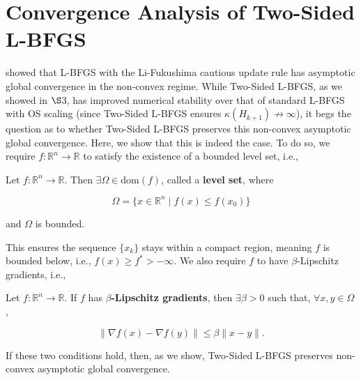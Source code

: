 \documentclass[twoside,11pt]{article}
\begin{document}
\section{Convergence Analysis of Two-Sided L-BFGS}

\cite{LF01-SIAM} showed that L-BFGS with the Li-Fukushima cautious update rule has asymptotic global convergence in the non-convex regime. While Two-Sided L-BFGS, as we showed in $\S$3, has improved numerical stability over that of standard L-BFGS with OS scaling (since Two-Sided L-BFGS ensures $\kappa(H_{k+1}) \not\rightarrow \infty$), it begs the question as to whether Two-Sided L-BFGS preserves this non-convex asymptotic global convergence. Here, we show that this is indeed the case. To do so, we require $f: \mathbb{R}^n \to \mathbb{R}$ to satisfy the existence of a bounded level set, i.e.,

\begin{definition}
Let $f: \mathbb{R}^n \to \mathbb{R}$. Then $\exists \Omega \in \text{dom}(f)$, called a \textbf{level set}, where

\[
\Omega = \{x \in \mathbb{R}^n \mid f(x) \leq f(x_0)\}
\]

\noindent
and $\Omega$ is bounded.
\end{definition}

\noindent
This ensures the sequence $\{x_k\}$ stays within a compact region, meaning $f$ is bounded below, i.e.,  $f(x) \geq f^* > -\infty$. We also require $f$ to have $\beta$-Lipschitz gradients, i.e.,

\begin{definition}
Let $f: \mathbb{R}^n \to \mathbb{R}$. If $f$ has \textbf{$\beta$-Lipschitz gradients}, then $\exists \beta > 0$ such that, $\forall x,y \in \Omega$,

\[
\|\nabla f(x) - \nabla f(y)\| \leq \beta \|x - y\|.
\]
\end{definition}

\noindent
If these two conditions hold, then, as we show, Two-Sided L-BFGS preserves non-convex asymptotic global convergence.
\end{document}
